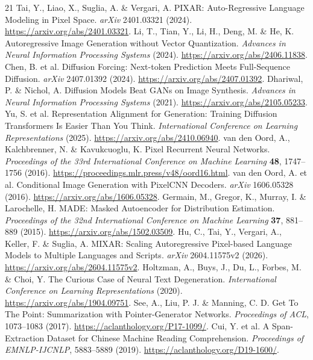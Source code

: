 \documentclass[12pt,a4paper]{article}
\begin{document}
\begin{thebibliography}{21}
\small
{}
 Tai, Y., Liao, X., Suglia, A. \& Vergari, A. PIXAR: Auto-Regressive Language Modeling in Pixel Space. \emph{arXiv} 2401.03321 (2024). \url{https://arxiv.org/abs/2401.03321}.
 Li, T., Tian, Y., Li, H., Deng, M. \& He, K. Autoregressive Image Generation without Vector Quantization. \emph{Advances in Neural Information Processing Systems} (2024). \url{https://arxiv.org/abs/2406.11838}.
 Chen, B. et al. Diffusion Forcing: Next-token Prediction Meets Full-Sequence Diffusion. \emph{arXiv} 2407.01392 (2024). \url{https://arxiv.org/abs/2407.01392}.
 Dhariwal, P. \& Nichol, A. Diffusion Models Beat GANs on Image Synthesis. \emph{Advances in Neural Information Processing Systems} (2021). \url{https://arxiv.org/abs/2105.05233}.
 Yu, S. et al. Representation Alignment for Generation: Training Diffusion Transformers Is Easier Than You Think. \emph{International Conference on Learning Representations} (2025). \url{https://arxiv.org/abs/2410.06940}.
 van den Oord, A., Kalchbrenner, N. \& Kavukcuoglu, K. Pixel Recurrent Neural Networks. \emph{Proceedings of the 33rd International Conference on Machine Learning} \textbf{48}, 1747--1756 (2016). \url{https://proceedings.mlr.press/v48/oord16.html}.
 van den Oord, A. et al. Conditional Image Generation with PixelCNN Decoders. \emph{arXiv} 1606.05328 (2016). \url{https://arxiv.org/abs/1606.05328}.
 Germain, M., Gregor, K., Murray, I. \& Larochelle, H. MADE: Masked Autoencoder for Distribution Estimation. \emph{Proceedings of the 32nd International Conference on Machine Learning} \textbf{37}, 881--889 (2015). \url{https://arxiv.org/abs/1502.03509}.
 Hu, C., Tai, Y., Vergari, A., Keller, F. \& Suglia, A. MIXAR: Scaling Autoregressive Pixel-based Language Models to Multiple Languages and Scripts. \emph{arXiv} 2604.11575v2 (2026). \url{https://arxiv.org/abs/2604.11575v2}.
 Holtzman, A., Buys, J., Du, L., Forbes, M. \& Choi, Y. The Curious Case of Neural Text Degeneration. \emph{International Conference on Learning Representations} (2020). \url{https://arxiv.org/abs/1904.09751}.
 See, A., Liu, P. J. \& Manning, C. D. Get To The Point: Summarization with Pointer-Generator Networks. \emph{Proceedings of ACL}, 1073--1083 (2017). \url{https://aclanthology.org/P17-1099/}.
 Cui, Y. et al. A Span-Extraction Dataset for Chinese Machine Reading Comprehension. \emph{Proceedings of EMNLP-IJCNLP}, 5883--5889 (2019). \url{https://aclanthology.org/D19-1600/}.

\end{thebibliography}
\end{document}
